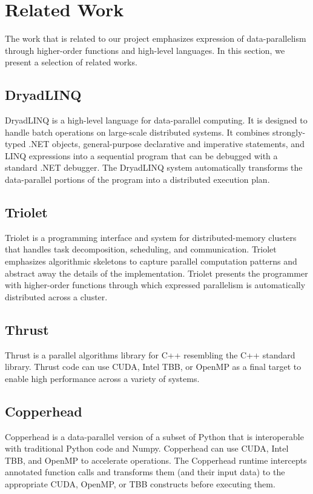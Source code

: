 \section*{Related Work}

The work that is related to our project emphasizes expression of 
data-parallelism through higher-order functions and high-level languages. In
this section, we present a selection of related works.

\subsection*{DryadLINQ}
DryadLINQ\cite{yu2008dryadlinq} is a high-level language for data-parallel
computing. It is designed to handle batch operations on large-scale
distributed systems. It combines strongly-typed .NET objects,
general-purpose declarative and imperative statements, and LINQ expressions
into a sequential program that can be debugged with a standard .NET debugger.
The DryadLINQ system automatically transforms the data-parallel portions of the
program into a distributed execution plan.

\subsection*{Triolet}
Triolet\cite{rodrigues2014triolet} is a programming interface and system for
distributed-memory clusters that handles task decomposition, scheduling, and
communication. Triolet emphasizes algorithmic skeletons to capture parallel
computation patterns and abstract away the details of the implementation.
Triolet presents the programmer with higher-order functions through which
expressed parallelism is automatically distributed across a cluster.

\subsection*{Thrust}
Thrust\cite{thrust} is a parallel algorithms library for C++ resembling the C++
standard library. Thrust code can use CUDA, Intel TBB, or OpenMP as a final
target to enable high performance across a variety of systems.

\subsection*{Copperhead}
Copperhead\cite{copperhead} is a data-parallel version of a subset of Python
that is
interoperable with traditional Python code and Numpy. Copperhead can use CUDA,
Intel TBB, and OpenMP to accelerate operations. The Copperhead runtime
intercepts annotated function calls and transforms them (and their input data)
to the appropriate
CUDA, OpenMP, or TBB constructs before executing them.

